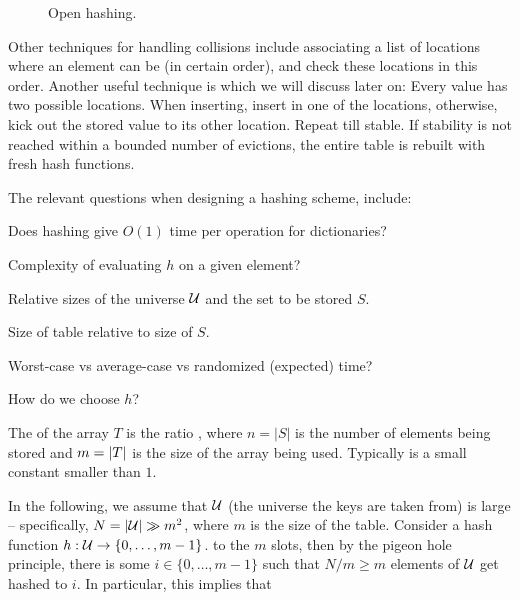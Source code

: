 \begin{figure}[h]
    \centerline{}
    \caption{Open hashing.}
\end{figure}

\smallskip%

Other techniques for handling collisions include associating a list of
locations where an element can be (in certain order), and check these
locations in this order. Another useful technique is  which we will discuss later on: Every
value has two possible locations. When inserting, insert in one of the
locations, otherwise, kick out the stored value to its other
location. Repeat till stable. If stability is not reached within a
bounded number of evictions, the entire table is rebuilt with fresh hash
functions.
    
The relevant questions when designing a hashing scheme, include:
\begin{compactenumI}%
    \smallskip%
    \item Does hashing give $O(1)$ time per operation for
    dictionaries?

    \smallskip%
    \item Complexity of evaluating $h$ on a given element?

    \smallskip%
    \item Relative sizes of the universe $\mathcal{U}$ and the set to be
    stored $S$.  \item Size of table relative to size of $S$.  \item
    Worst-case vs average-case vs randomized (expected) time?  \item
    How do we choose $h$?
\end{compactenumI}

The  of the array $T$ is the ratio , where
$n = |S|$ is the number of elements being stored and $m = \left| {T} \right|$
is the size of the array being used.  Typically  is a small
constant smaller than $1$.

In the following, we assume that $\mathcal{U}$ (the universe the keys are
taken from) is large -- specifically, $N = \left| {\mathcal{U}} \right| \gg m^2$,
where $m$ is the size of the table.  Consider a hash function
$h : \mathcal{U} \rightarrow \{0,\ldots, m-1\}$.   to the $m$
slots, then by the pigeon hole principle, there is some
$i \in \{0,\ldots,m-1\}$ such that $N/m \geq m$ elements of $\mathcal{U}$ get
hashed to $i$.  In particular, this implies that 

